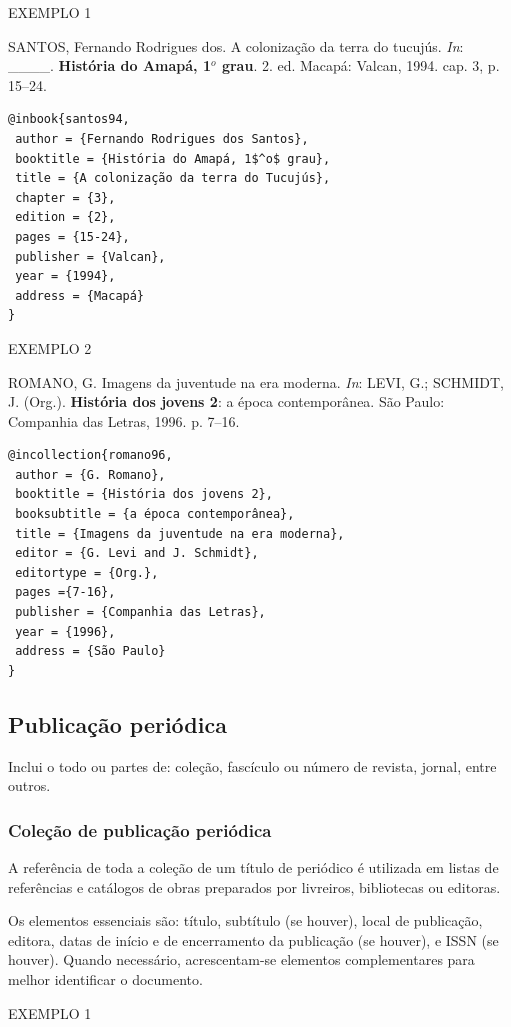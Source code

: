 EXEMPLO 1 

SANTOS, Fernando Rodrigues dos. A colonização da terra do tucujús. \textit{In}: \_\_\_\_. \textbf{História do Amapá, 1$^o$ grau}. 2. ed. Macapá: Valcan, 1994. cap. 3, p. 15–24.

\begin{verbatim}
@inbook{santos94,
 author = {Fernando Rodrigues dos Santos},
 booktitle = {História do Amapá, 1$^o$ grau},
 title = {A colonização da terra do Tucujús},
 chapter = {3},
 edition = {2},
 pages = {15-24},
 publisher = {Valcan},
 year = {1994},
 address = {Macapá}
}
\end{verbatim}

EXEMPLO 2 

ROMANO, G. Imagens da juventude na era moderna. \textit{In}: LEVI, G.; SCHMIDT, J. (Org.). \textbf{História dos jovens 2}: a época contemporânea. São Paulo: Companhia das Letras, 1996. p. 7–16.

\begin{verbatim}
@incollection{romano96,
 author = {G. Romano},
 booktitle = {História dos jovens 2},
 booksubtitle = {a época contemporânea},
 title = {Imagens da juventude na era moderna},
 editor = {G. Levi and J. Schmidt},
 editortype = {Org.},
 pages ={7-16},
 publisher = {Companhia das Letras},
 year = {1996},
 address = {São Paulo}
}
\end{verbatim}

\subsection{Publicação periódica}

Inclui o todo ou partes de: coleção, fascículo ou número de revista, jornal, entre outros.

\subsubsection{Coleção de publicação periódica}

A referência de toda a coleção de um título de periódico é utilizada em listas de referências e catálogos de obras preparados por livreiros, bibliotecas ou editoras.

Os elementos essenciais são: título, subtítulo (se houver), local de publicação, editora, datas de início e de encerramento da publicação (se houver), e ISSN (se houver). Quando necessário, acrescentam-se elementos complementares para melhor identificar o documento.

EXEMPLO 1 


